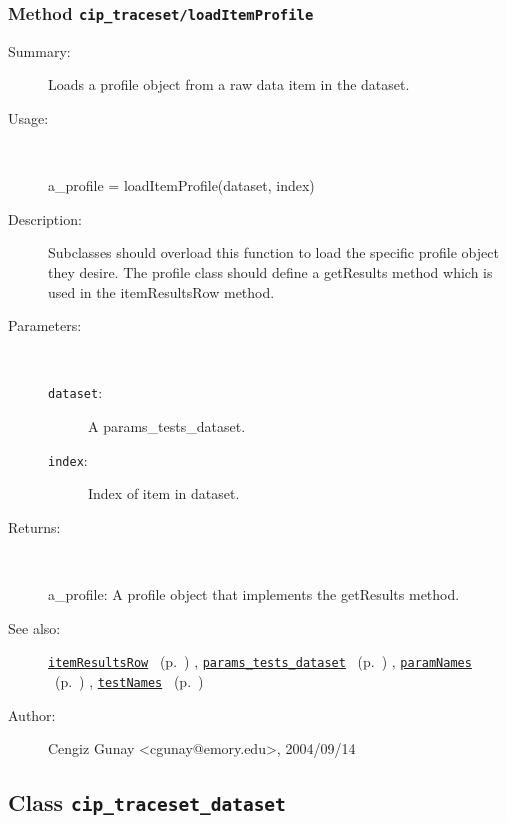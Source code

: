 \subsubsection[Method \texttt{loadItemProfile}]{Method \texttt{cip\_traceset/loadItemProfile}}%
%
\label{ref_cip_traceset__loadItemProfile}%
\hypertarget{ref_cip_traceset__loadItemProfile}{}%
\begin{description}
\item[Summary:]Loads a profile object from a raw data item in the dataset.
%
\item[Usage:]~%
\begin{lyxcode}%
a\_profile = loadItemProfile(dataset, index)
%
\end{lyxcode}%
%
\item[Description:]%
Subclasses should overload this function to load the specific profile
 object they desire. The profile class should define a getResults method
 which is used in the itemResultsRow method.
\item[Parameters:]~
\begin{description}%
\item[\texttt{dataset}:]
 A params\_tests\_dataset.
\item[\texttt{index}:]
 Index of item in dataset.
\end{description}%
%
\item[Returns:]~

	a\_profile: A profile object that implements the getResults method.
%
%
\item[See also:]%
\hyperlink{ref_itemResultsRow}{\texttt{itemResultsRow}}%
\ (p.~\pageref{ref_itemResultsRow})%
%
, \hyperlink{ref_params_tests_dataset}{\texttt{params\_tests\_dataset}}%
\ (p.~\pageref{ref_params_tests_dataset})%
%
, \hyperlink{ref_paramNames}{\texttt{paramNames}}%
\ (p.~\pageref{ref_paramNames})%
%
, \hyperlink{ref_testNames}{\texttt{testNames}}%
\ (p.~\pageref{ref_testNames})%
%
%
\item[Author:]%
Cengiz Gunay <cgunay@emory.edu>, 2004/09/14%
\end{description}
\methodline%
\subsection{Class \texttt{cip\_traceset\_dataset}}%
%
\label{ref_cip_traceset_dataset}%
\hypertarget{ref_cip_traceset_dataset}{}%
